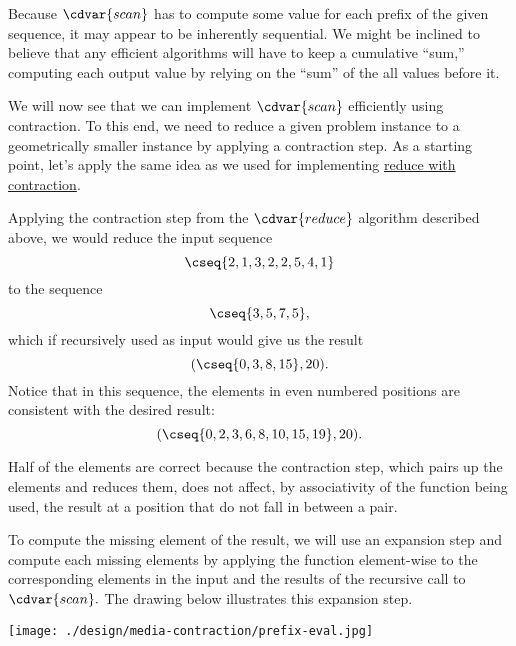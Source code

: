 \begin{gram}

Because $\cdvar{scan}$ has to compute some value for each
prefix of the given sequence, it may appear to be inherently sequential.  
%
We might be inclined to believe that any efficient algorithms will
have to keep a cumulative ``sum,'' computing each output value by
relying on the ``sum'' of the all values before it.  
%

We will now see that we can implement $\cdvar{scan}$ efficiently using contraction.  To this
end, we need to reduce a given problem instance to a geometrically
smaller instance by applying a contraction step.
%
As a starting point, let's apply the same idea as we used for
implementing 
%
\href{alg:design::contraction::reduce}{reduce with contraction}.
%

Applying the contraction step from the $\cdvar{reduce}$ algorithm
described above, we would reduce the input sequence
\[
\cseq{2,1,3,2,2,5,4,1}
\]
to the sequence
\[
\cseq{3,5,7,5},
\]
which if recursively used as input would give us the result
\[
(\cseq{ 0, 3, 8, 15 }, 20).
\]
Notice that in this sequence, the elements in even numbered positions are consistent with the desired result:
\[
(\cseq{0, 2, 3, 6, 8, 10, 15, 19}, 20).
\]

Half of the elements are correct because the
contraction step, which pairs up the elements and reduces them, does
not affect, by associativity of the function being used, the result at
a position that do not fall in between a pair.  
%

To compute the missing element of the result, we will use an expansion
step and compute each missing elements by applying
the function element-wise to the corresponding elements in the input and the results of the recursive call to $\cdvar{scan}.$
%
The drawing below illustrates this expansion step.
\begin{center}
  \texttt{[image: ./design/media-contraction/prefix-eval.jpg]}
\end{center}
\end{gram}


